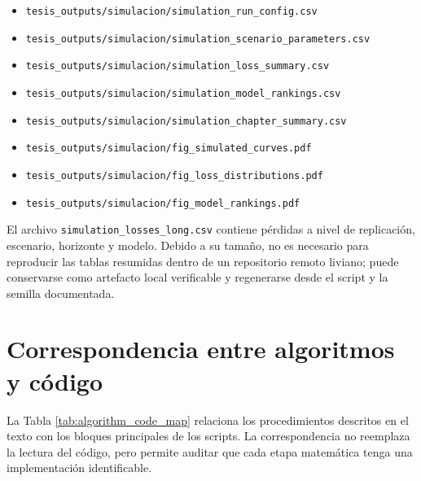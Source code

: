\documentclass[a4paper,11pt]{article}
\begin{document}
\begin{itemize}
  \item \texttt{tesis\_outputs/simulacion/simulation\_run\_config.csv}
  \item \texttt{tesis\_outputs/simulacion/simulation\_scenario\_parameters.csv}
  \item \texttt{tesis\_outputs/simulacion/simulation\_loss\_summary.csv}
  \item \texttt{tesis\_outputs/simulacion/simulation\_model\_rankings.csv}
  \item \texttt{tesis\_outputs/simulacion/simulation\_chapter\_summary.csv}
  \item \texttt{tesis\_outputs/simulacion/fig\_simulated\_curves.pdf}
  \item \texttt{tesis\_outputs/simulacion/fig\_loss\_distributions.pdf}
  \item \texttt{tesis\_outputs/simulacion/fig\_model\_rankings.pdf}
\end{itemize}

El archivo \texttt{simulation\_losses\_long.csv} contiene pérdidas a nivel de replicación, escenario, horizonte y modelo. Debido a su tamaño, no es necesario para reproducir las tablas resumidas dentro de un repositorio remoto liviano; puede conservarse como artefacto local verificable y regenerarse desde el script y la semilla documentada.

\section{Correspondencia entre algoritmos y código}

La Tabla \ref{tab:algorithm_code_map} relaciona los procedimientos descritos en el texto con los bloques principales de los scripts. La correspondencia no reemplaza la lectura del código, pero permite auditar que cada etapa matemática tenga una implementación identificable.
\end{document}
